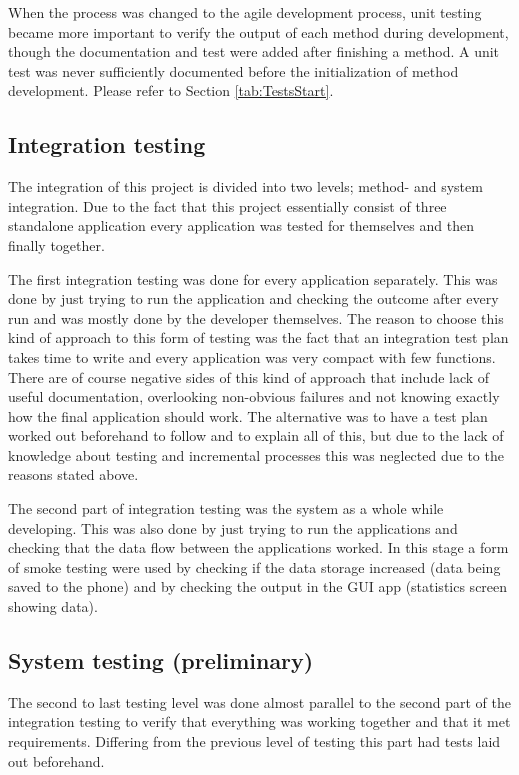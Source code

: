 When the process was changed to the agile development process, unit testing became more important to verify the output of each method during development, though the documentation and test were added after finishing a method. A unit test was never sufficiently documented before the initialization of method development. Please refer to Section \ref{tab:TestsStart}.
\subsection{Integration testing}
The integration of this project is divided into two levels; method- and system integration. Due to the fact that this project essentially consist of three standalone application every application was tested for themselves and then finally together.

The first integration testing was done for every application separately. This was done by just trying to run the application and checking the outcome after every run and was mostly done by the developer themselves. The reason to choose this kind of approach to this form of testing was the fact that an integration test plan takes time to write and every application was very compact with few functions. There are of course negative sides of this kind of approach that include lack of useful documentation, overlooking non-obvious failures and not knowing exactly how the final application should work. The alternative was to have a test plan worked out beforehand to follow and to explain all of this, but due to the lack of knowledge about testing and incremental processes this was neglected due to the reasons stated above.

The second part of integration testing was the system as a whole while developing. This was also done by just trying to run the applications and checking that the data flow between the applications worked. In this stage a form of smoke testing were used by checking if the data storage increased (data being saved to the phone) and by checking the output in the GUI app (statistics screen showing data).
\subsection{System testing (preliminary)} %
The second to last testing level was done almost parallel to the second part of the integration testing to verify that everything was working together and that it met requirements. Differing from the previous level of testing this part had tests laid out beforehand.

